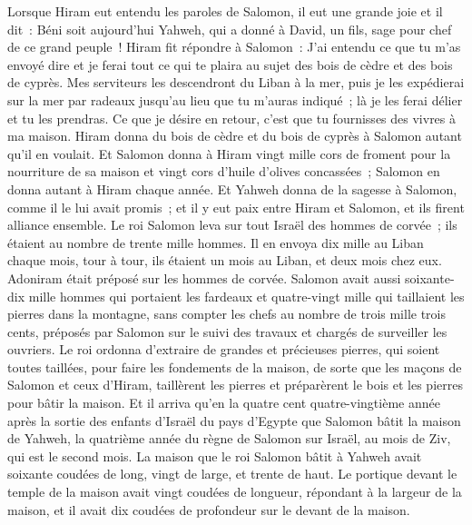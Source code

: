 \begin{multicols}{2}
Lorsque Hiram eut entendu les paroles de Salomon, il eut une grande joie et il dit~: Béni soit aujourd'hui Yahweh, qui a donné à David, un fils, sage pour chef de ce grand peuple~!
Hiram fit répondre à Salomon~: J'ai entendu ce que tu m'as envoyé dire et je ferai tout ce qui te plaira au sujet des bois de cèdre et des bois de cyprès.
Mes serviteurs les descendront du Liban à la mer, puis je les expédierai sur la mer par radeaux jusqu'au lieu que tu m'auras indiqué~; là je les ferai délier et tu les prendras. Ce que je désire en retour, c'est que tu fournisses des vivres à ma maison.
Hiram donna du bois de cèdre et du bois de cyprès à Salomon autant qu'il en voulait.
Et Salomon donna à Hiram vingt mille cors de froment pour la nourriture de sa maison et vingt cors d'huile d'olives concassées~; Salomon en donna autant à Hiram chaque année.
Et Yahweh donna de la sagesse à Salomon, comme il le lui avait promis~; et il y eut paix entre Hiram et Salomon, et ils firent alliance ensemble.
Le roi Salomon leva sur tout Israël des hommes de corvée~; ils étaient au nombre de trente mille hommes.
Il en envoya dix mille au Liban chaque mois, tour à tour, ils étaient un mois au Liban, et deux mois chez eux. Adoniram était préposé sur les hommes de corvée.
Salomon avait aussi soixante-dix mille hommes qui portaient les fardeaux et quatre-vingt mille qui taillaient les pierres dans la montagne,
sans compter les chefs au nombre de trois mille trois cents, préposés par Salomon sur le suivi des travaux et chargés de surveiller les ouvriers.
Le roi ordonna d'extraire de grandes et précieuses pierres, qui soient toutes taillées, pour faire les fondements de la maison,
de sorte que les maçons de Salomon et ceux d'Hiram, taillèrent les pierres et préparèrent le bois et les pierres pour bâtir la maison.
\VerseOne{}Et il arriva qu'en la quatre cent quatre-vingtième année après la sortie des enfants d'Israël du pays d'Egypte que Salomon bâtit la maison de Yahweh, la quatrième année du règne de Salomon sur Israël, au mois de Ziv, qui est le second mois.
La maison que le roi Salomon bâtit à Yahweh avait soixante coudées de long, vingt de large, et trente de haut.
Le portique devant le temple de la maison avait vingt coudées de longueur, répondant à la largeur de la maison, et il avait dix coudées de profondeur sur le devant de la maison.

\end{multicols}
